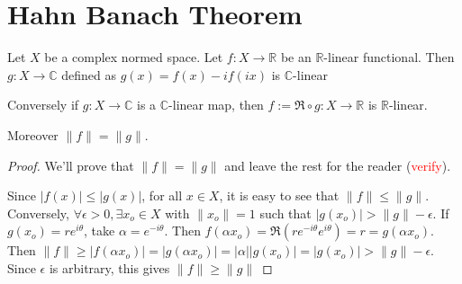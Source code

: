 
\chapter{Hahn Banach Theorem}
\begin{lemma}
  \label{lem:C_linear_map_from_R_linear}
  Let $X$ be a complex normed space. Let $f: X \to \mathbb{R}$ be an $\mathbb{R}$-linear functional. Then $g: X \to \mathbb{C}$ defined as $g(x) = f(x) - i f(ix)$ is $\mathbb{C}$-linear

  Conversely if $g: X \to \mathbb{C}$ is a $\mathbb{C}$-linear map, then $f:= \Re\circ g: X \to \mathbb{R}$ is $\mathbb{R}$-linear.

  Moreover $\|f\| = \|g\|$.
\end{lemma}
\begin{proof}
  We'll prove that $ \|f\| = \|g\|$ and leave the rest for the reader (\textcolor{red}{verify}).

  Since $|f(x)| \le |g(x)|$, for all $x \in X$, it is easy to see that $\|f\| \le \|g\|$. Conversely, $\forall \epsilon > 0, \exists x_o \in X$ with $\|x_o\| = 1$ such that $|g(x_o)| > \|g\| - \epsilon$. If $g(x_o)= re^{i\theta}$, take  $\alpha = e^{-i\theta}$. Then $f(\alpha x_o) = \Re(r e^{-i \theta}e^{ i \theta}) = r = g(\alpha x_o)$. Then $\|f\| \ge |f(\alpha x_o)| =  |g(\alpha x_o)| = |\alpha||g(x_o)| = |g(x_o)| > \|g\| - \epsilon$. Since $\epsilon$ is arbitrary, this gives $\|f\| \ge \|g\|$
\end{proof}


